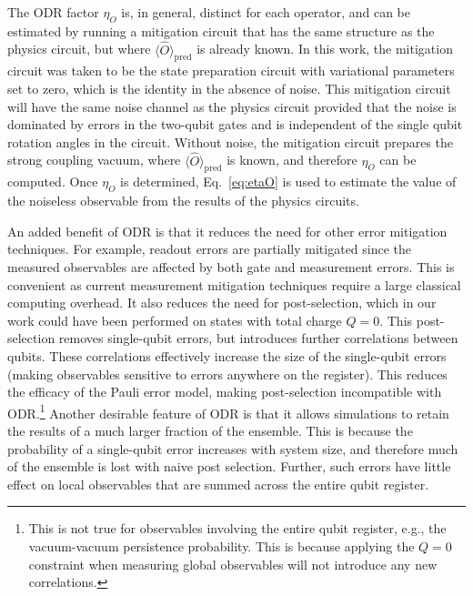 \documentclass[aps, pra, onecolumn, tightenlines, letterpaper, amsmath, amssymb, preprintnumbers, floatfix, longbibliography, nofootinbib]{revtex4-2}
\begin{document}
The ODR factor $\eta_O$ is, in general, 
distinct for each operator, and can be estimated by running a mitigation circuit that has the same structure as the physics circuit, but where $\langle \hat{O} \rangle_{\text{pred}}$ is already known.
In this work, the mitigation circuit was taken to be the state preparation circuit with variational parameters set to zero, which is the identity in the absence of noise.
This mitigation circuit will have the same noise channel as the physics circuit provided that the noise is dominated by errors in the two-qubit gates and is independent of the single qubit rotation angles in the circuit. Without noise, the mitigation circuit prepares the strong coupling vacuum, where  $\langle \hat{O} \rangle_{\text{pred}}$ is known, 
and therefore $\eta_O$ can be computed.
Once $\eta_O$ is determined, Eq.~\eqref{eq:etaO} is used to estimate the  value of the noiseless observable from the 
results of the physics circuits.

An added benefit of ODR is that it reduces the need for other error mitigation techniques.
For example, readout errors are 
partially mitigated since the measured observables are affected by both gate and measurement errors.
This is convenient as current measurement mitigation techniques require a large classical computing overhead.
It also reduces the need for post-selection, which in our work could have been performed on states with total charge $Q = 0$.
This post-selection removes single-qubit errors, but introduces further correlations between qubits. These correlations effectively increase the size of the 
single-qubit errors (making observables sensitive to errors anywhere on the register).
This reduces the efficacy of the Pauli error model, making post-selection incompatible with ODR.\footnote{This is not true for observables involving the entire qubit register, 
e.g., the vacuum-vacuum persistence probability. 
This is because applying the $Q=0$ constraint when measuring global observables will not introduce any new correlations.}
Another desirable feature of ODR is that it allows simulations to retain the results of 
a much larger fraction of the ensemble. 
This is because 
the probability of a single-qubit error increases with system size, 
and therefore much of the ensemble is lost with naive post selection.
Further, such errors have little effect on local observables that are summed across the entire qubit register.





\clearpage
\end{document}
